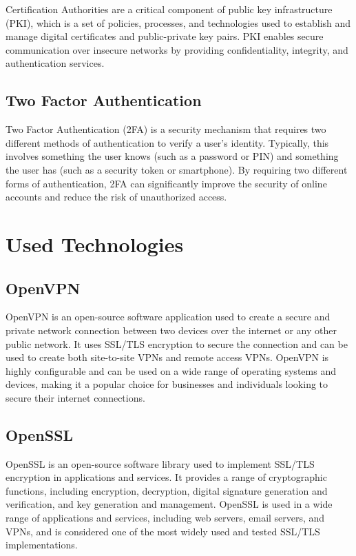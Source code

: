 \documentclass[12pt]{article}
\begin{document}
Certification Authorities are a critical component of public key infrastructure (PKI), which is a set of policies, processes, and technologies used to establish and manage digital certificates and public-private key pairs. PKI enables secure communication over insecure networks by providing confidentiality, integrity, and authentication services.

\subsection{Two Factor Authentication}
Two Factor Authentication (2FA) is a security mechanism that requires two different methods of authentication to verify a user's identity. Typically, this involves something the user knows (such as a password or PIN) and something the user has (such as a security token or smartphone). By requiring two different forms of authentication, 2FA can significantly improve the security of online accounts and reduce the risk of unauthorized access.

\newpage

\section{Used Technologies}

\subsection{OpenVPN}
OpenVPN is an open-source software application used to create a secure and private network connection between two devices over the internet or any other public network. It uses SSL/TLS encryption to secure the connection and can be used to create both site-to-site VPNs and remote access VPNs. OpenVPN is highly configurable and can be used on a wide range of operating systems and devices, making it a popular choice for businesses and individuals looking to secure their internet connections.

\subsection{OpenSSL}
OpenSSL is an open-source software library used to implement SSL/TLS encryption in applications and services. It provides a range of cryptographic functions, including encryption, decryption, digital signature generation and verification, and key generation and management. OpenSSL is used in a wide range of applications and services, including web servers, email servers, and VPNs, and is considered one of the most widely used and tested SSL/TLS implementations.
\end{document}
